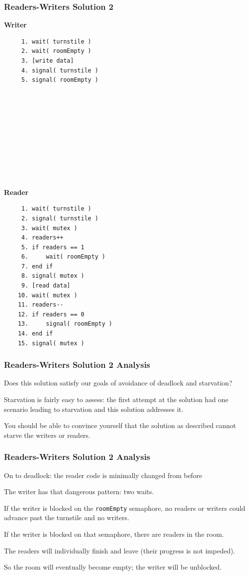 \begin{frame}[fragile]
\frametitle{Readers-Writers Solution 2}
\begin{multicols}{2}
\textbf{Writer}
  \begin{verbatim}
	 1. wait( turnstile )
	 2. wait( roomEmpty )
	 3. [write data]
	 4. signal( turnstile )
	 5. signal( roomEmpty )
	 
	 
	 
	 
	 
	 
	 
	 
	 
	 
  \end{verbatim}
\columnbreak
\textbf{Reader}
  \begin{verbatim}
	 1. wait( turnstile )
	 2. signal( turnstile )
	 3. wait( mutex )
	 4. readers++
	 5. if readers == 1
	 6.     wait( roomEmpty )
	 7. end if
	 8. signal( mutex )
	 9. [read data]
	10. wait( mutex )
	11. readers--
	12. if readers == 0
	13.     signal( roomEmpty )
	14. end if
	15. signal( mutex )
  \end{verbatim}
\end{multicols}

\end{frame}


\begin{frame}
\frametitle{Readers-Writers Solution 2 Analysis}

Does this solution satisfy our goals of avoidance of deadlock and starvation? 

Starvation is fairly easy to assess: the first attempt at the solution had one scenario leading to starvation and this solution addresses it. 

You should be able to convince yourself that the solution as described cannot starve the writers or readers.


\end{frame}


\begin{frame}
\frametitle{Readers-Writers Solution 2 Analysis}

On to deadlock: the reader code is minimally changed from before 

The writer has that dangerous pattern: two waits. 

If the writer is blocked on the \texttt{roomEmpty} semaphore, no readers or writers could advance past the turnstile and no writers. 

If the writer is blocked on that semaphore, there are readers in the room. 

The readers will individually finish and leave (their progress is not impeded). 

So the room will eventually become empty; the writer will be unblocked.


\end{frame}

